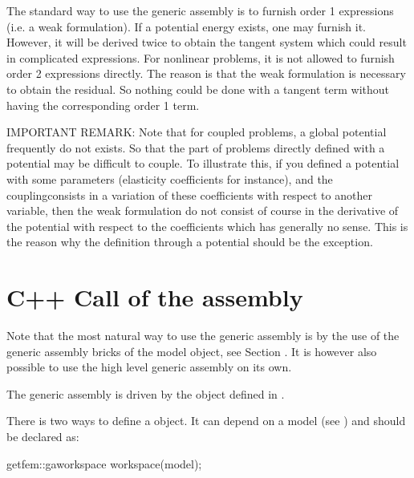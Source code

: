 \documentclass[a4paper,11pt,english]{sphinxmanual}
\begin{document}
The standard way to use the generic assembly is to furnish order 1 expressions (i.e. a weak formulation). If a potential energy exists, one may furnish it. However, it will be derived twice to obtain the tangent system which could result in complicated expressions. For nonlinear problems, it is not allowed to furnish order 2 expressions directly. The reason is that the weak formulation is necessary to obtain the residual. So nothing could be done with a tangent term without having the corresponding order 1 term.

IMPORTANT REMARK: Note that for coupled problems, a global potential frequently do not exists. So that the part of problems directly defined with a potential may be difficult to couple. To illustrate this, if you defined a potential with some parameters (elasticity coefficients for instance), and the couplingconsists in a variation of these coefficients with respect to another variable, then the weak formulation do not consist of course in the derivative of the potential with respect to the coefficients which has generally no sense. This is the reason why the definition through a potential should be the exception.


\section{C++ Call of the assembly}
\label{\detokenize{userdoc/gasm_high:c-call-of-the-assembly}}
Note that the most natural way to use the generic assembly is by the use of the generic assembly bricks of the model object, see Section {\hyperref[\detokenize{userdoc/model_generic_assembly:ud-model-generic-assembly}]{}}. It is however also possible to use the high level generic assembly on its own.

The generic assembly is driven by the object  defined in .

There is two ways to define a  object. It can depend on a model (see {\hyperref[\detokenize{userdoc/model:ud-model}]{}}) and should be declared as:

\begin{sphinxVerbatim}[commandchars=\\\{\}]
getfem::ga\PYGZus{}workspace workspace(model);
\end{sphinxVerbatim}
\end{document}
